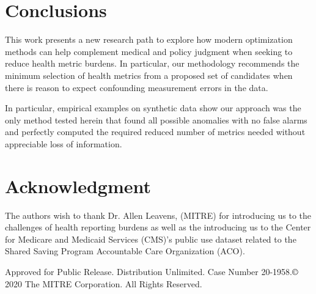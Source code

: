 \documentclass[conference]{IEEEtran}
\begin{document}

\section{Conclusions}

This work presents a new research path to explore how modern optimization methods can help complement medical and policy judgment when seeking to reduce health metric burdens.  In particular, our methodology recommends  the minimum selection of health metrics from a proposed set of candidates when there is reason to expect confounding measurement errors in the data.

In particular, empirical examples on synthetic data show our approach was the only method tested herein that found all possible anomalies with no false alarms and perfectly computed the required reduced number of metrics needed without appreciable loss of information. 



\section{Acknowledgment}
The authors wish to thank Dr. Allen Leavens, (MITRE) for introducing us to the challenges of health reporting burdens as well as the introducing us to the Center for Medicare and Medicaid Services (CMS)'s public use dataset related to the Shared Saving Program Accountable Care Organization (ACO).  

Approved for Public Release. Distribution Unlimited. Case Number 20-1958.$\copyright$ 2020 The MITRE Corporation. All Rights Reserved.


\clearpage







\newpage
\listoftodos[Notes]
\end{document}
